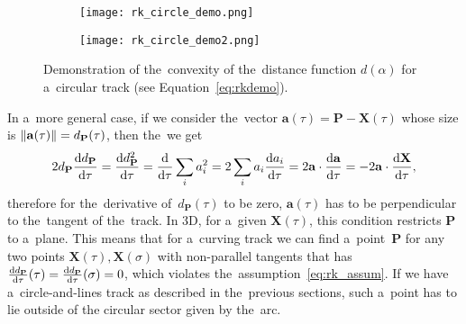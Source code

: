 		\begin{figure}
			\centering
			\begin{subfigure}[t]{0.7\textwidth}
				\centering
				\texttt{[image: rk\_circle\_demo.png]}
			\end{subfigure}
			\hfill
			\begin{subfigure}[t]{0.29\textwidth}
				\centering
				\texttt{[image: rk\_circle\_demo2.png]}
			\end{subfigure}
			\caption{Demonstration of the~convexity of the~distance function $d(\alpha)$ for a~circular track (see Equation~\ref{eq:rkdemo}).}
			\label{fig:rkdemo}
		\end{figure}
		
		In a~more general case, if we consider the~vector $\mathbf{a}(\tau) = \mathbf{P}-\mathbf{X}(\tau)$ whose size is $\norm{\mathbf{a}(\tau)} = d_\mathbf{P}(\tau)$, then the~we get
			\begin{equation}
				2d_{\mathbf{P}}\dv{d_{\mathbf{P}}}{\tau}= \dv{d^2_{\mathbf{P}}}{\tau} = \dv{}{\tau} \sum_i a_i^2 = 2\sum_i a_i\dv{a_i}{\tau} = 2\mathbf{a}\cdot\dv{\mathbf{a}}{\tau} = -2\mathbf{a}\cdot\dv{\mathbf{X}}{\tau},
			\end{equation}
		therefore for the~derivative of~$d_\mathbf{P}(\tau)$ to be zero, $\mathbf{a}(\tau)$ has to be perpendicular to the~tangent of the~track. In 3D, for a~given $\mathbf{X}(\tau)$, this condition restricts $\mathbf{P}$ to a~plane. This means that for a~curving track we can find a~point~$\mathbf{P}$ for any two points $\mathbf{X}(\tau),\mathbf{X}(\sigma)$ with non-parallel tangents that has $\dv{d_{\mathbf{P}}}{\tau}{(\tau)} = \dv{d_{\mathbf{P}}}{\tau}{(\sigma)} = 0$, which violates the~assumption~\ref{eq:rk_assum}. If we have a~circle-and-lines track as described in the~previous sections, such a~point has to lie outside of the circular sector given by the~arc.
		
